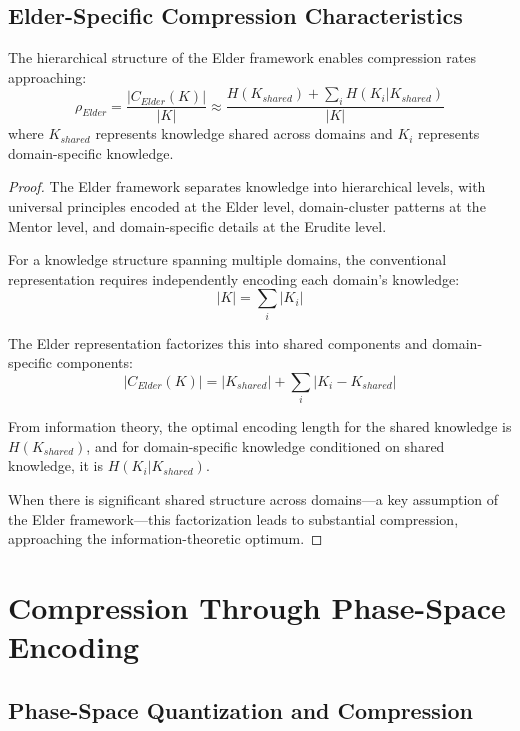 \subsection{Elder-Specific Compression Characteristics}

\begin{theorem}
The hierarchical structure of the Elder framework enables compression rates approaching:
\begin{equation}
\rho_{Elder} = \frac{|C_{Elder}(K)|}{|K|} \approx \frac{H(K_{shared}) + \sum_i H(K_i | K_{shared})}{|K|}
\end{equation}
where $K_{shared}$ represents knowledge shared across domains and $K_i$ represents domain-specific knowledge.
\end{theorem}

\begin{proof}
The Elder framework separates knowledge into hierarchical levels, with universal principles encoded at the Elder level, domain-cluster patterns at the Mentor level, and domain-specific details at the Erudite level.

For a knowledge structure spanning multiple domains, the conventional representation requires independently encoding each domain's knowledge:
\begin{equation}
|K| = \sum_i |K_i|
\end{equation}

The Elder representation factorizes this into shared components and domain-specific components:
\begin{equation}
|C_{Elder}(K)| = |K_{shared}| + \sum_i |K_i - K_{shared}|
\end{equation}

From information theory, the optimal encoding length for the shared knowledge is $H(K_{shared})$, and for domain-specific knowledge conditioned on shared knowledge, it is $H(K_i | K_{shared})$.

When there is significant shared structure across domains—a key assumption of the Elder framework—this factorization leads to substantial compression, approaching the information-theoretic optimum.
\end{proof}

\section{Compression Through Phase-Space Encoding}

\subsection{Phase-Space Quantization and Compression}

